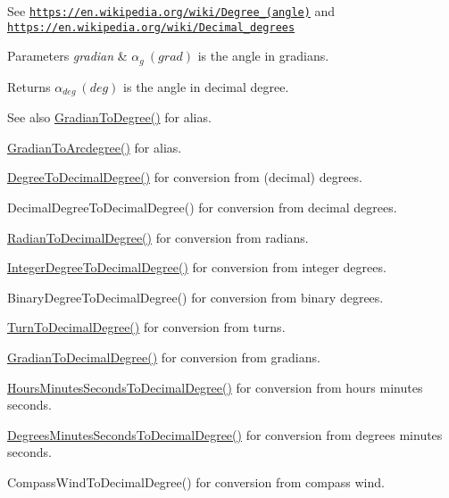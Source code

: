 See \href{https://en.wikipedia.org/wiki/Degree_(angle)}{\tt https\+://en.\+wikipedia.\+org/wiki/\+Degree\+\_\+(angle)} and \href{https://en.wikipedia.org/wiki/Decimal_degrees}{\tt https\+://en.\+wikipedia.\+org/wiki/\+Decimal\+\_\+degrees} 
\begin{DoxyParams}{Parameters}
{\em gradian} & $\alpha_{g}\ (grad)$ is the angle in gradians. \\
\hline
\end{DoxyParams}
\begin{DoxyReturn}{Returns}
$\alpha_{deg}\ (deg)$ is the angle in decimal degree. 
\end{DoxyReturn}
\begin{DoxySeeAlso}{See also}
\mbox{\hyperlink{group___e_g_x_math-_conversions-_angle_conversions-_gradian_gaa284952274f16d225951cf5139d0ff4e}{Gradian\+To\+Degree()}} for alias. 

\mbox{\hyperlink{group___e_g_x_math-_conversions-_angle_conversions-_gradian_gacd0b1797f2460944dcbc541a855ec21c}{Gradian\+To\+Arcdegree()}} for alias. 

\mbox{\hyperlink{group___e_g_x_math-_conversions-_angle_conversions-_degree_ga568afc1d436d425bf5d4edea584aee08}{Degree\+To\+Decimal\+Degree()}} for conversion from (decimal) degrees. 

Decimal\+Degree\+To\+Decimal\+Degree() for conversion from decimal degrees. 

\mbox{\hyperlink{group___e_g_x_math-_conversions-_angle_conversions-_radian_ga6d170f1882c32de53167c04524d05f67}{Radian\+To\+Decimal\+Degree()}} for conversion from radians. 

\mbox{\hyperlink{group___e_g_x_math-_conversions-_angle_conversions-_integer_degree_gac219c3198508ba984d8d81d22831b27d}{Integer\+Degree\+To\+Decimal\+Degree()}} for conversion from integer degrees. 

Binary\+Degree\+To\+Decimal\+Degree() for conversion from binary degrees. 

\mbox{\hyperlink{group___e_g_x_math-_conversions-_angle_conversions-_turn_ga79231536255e77fb7a158b99a30c1767}{Turn\+To\+Decimal\+Degree()}} for conversion from turns. 

\mbox{\hyperlink{group___e_g_x_math-_conversions-_angle_conversions-_gradian_ga346f47c519d5261b689cec49f4a8e789}{Gradian\+To\+Decimal\+Degree()}} for conversion from gradians. 

\mbox{\hyperlink{group___e_g_x_math-_conversions-_angle_conversions-_hours_minutes_seconds_gad6662d1113ae8aea6baca6317888b4cd}{Hours\+Minutes\+Seconds\+To\+Decimal\+Degree()}} for conversion from hours minutes seconds. 

\mbox{\hyperlink{group___e_g_x_math-_conversions-_angle_conversions-_degrees_minutes_seconds_gab4d4c25623f86611692c39eb29f16141}{Degrees\+Minutes\+Seconds\+To\+Decimal\+Degree()}} for conversion from degrees minutes seconds. 

Compass\+Wind\+To\+Decimal\+Degree() for conversion from compass wind. 
\end{DoxySeeAlso}
